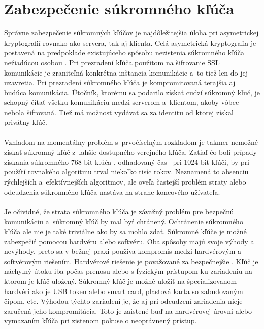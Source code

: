 \documentclass[
  digital, %
  table,   %
oneside,
  nolof,     %
  nolot,     %
]{fithesis3}
\begin{document}
\section{Zabezpečenie súkromného kľúča }
Správne zabezpečenie súkromných kľúčov je najdôležitejšia úloha pri asymetrickej kryptografií rovnako ako servera, tak aj klienta. Celá asymetrická kryptografia je postavená na predpoklade existujúceho spôsobu nezistenia súkromného kľúča nežiadúcou osobou \cite{ssl}. Pri prezradení kľúča použitom na šifrovanie SSL komunikácie je zraniteľná konkrétna inštancia komunikácie a~to tiež len do jej uzavretia. Pri prezradení súkromného kľúča je kompromitovaná terajšia aj budúca komunikácia. Útočník, ktorému sa podarilo získať cudzí súkromný kľuč, je schopný čítať všetku komunikáciu medzi serverom a~klientom, akoby vôbec nebola šifrovaná. Tiež má možnosť vydávať sa za identitu od ktorej získal privátny kľúč.\paragraph{}
Vzhľadom na momentálny problém s~prvočíselným rozkladom je takmer nemožné získať súkromný kľúč z~ľahšie dostupného verejného kľúča. Zatiaľ čo boli prípady získania súkromného 768-bit kľúča \cite{crypt768}, odhadovaný čas~ pri 1024-bit kľúči, by pri  použítí rovnakého algoritmu trval niekoľko tisíc rokov. Neznamená to absenciu rýchlejších a~efektívnejších algoritmov, ale oveľa častejší problém straty alebo odcudzenia súkromného kľúča nastáva na strane koncového užívateľa.\paragraph{}
Je očividné, že strata súkromného kľúča je závažný problém pre bezpečnú komunikáciu a~súkromný kľúč by mal byť chránený. Ochránenie súkromného kľúča ale nie je také triviálne ako by sa mohlo zdať. Súkromné kľúče je možné zabezpečiť pomocou hardvéru alebo softvéru. Oba spôsoby majú svoje výhody a nevýhody, preto sa  v bežnej praxi používa kompromis medzi hardvérovým a softvérovým riešením.
Hardvérové riešenie je považované za bezpečnejšie \cite{privateKeyStorage}. Kľúč je náchylný útoku iba počas prenosu alebo s fyzickým prístupom ku zariadeniu na ktorom je kľúč uložený. Súkromný kľúč je možné uložiť na špecializovanom hardvéri ako je USB token alebo  smart card, plastová karta so zabudovaným čipom, etc. Výhodou týchto zariadení je, že aj pri odcudzení zariadenia nieje zaručená jeho kompromitácia. Toto je zaistené buď na hardvérovej úrovni alebo vymazaním kľúča pri zistenom pokuse o neoprávnený prístup.\paragraph{}
\end{document}
